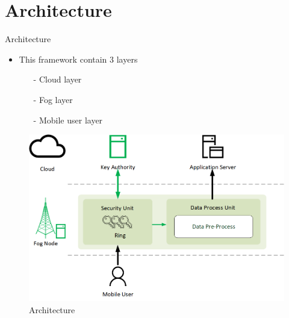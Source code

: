 \documentclass{beamer}
\begin{document}
\section{Architecture}
\begin{frame}{Architecture}
    \begin{itemize}
        \item {This framework contain 3 layers}
        \begin{itemize}
            \item[-] Cloud layer
            \item[-] Fog layer
            \item[-] Mobile user layer
        \end{itemize}
    \end{itemize}
\end{frame}
\begin{frame}{}
    \begin{figure}[t]
        \centering
        \includegraphics[width=1.0\textwidth]{figures/1.png}
        \caption{Architecture}
    \end{figure}
\end{frame}
\end{document}
